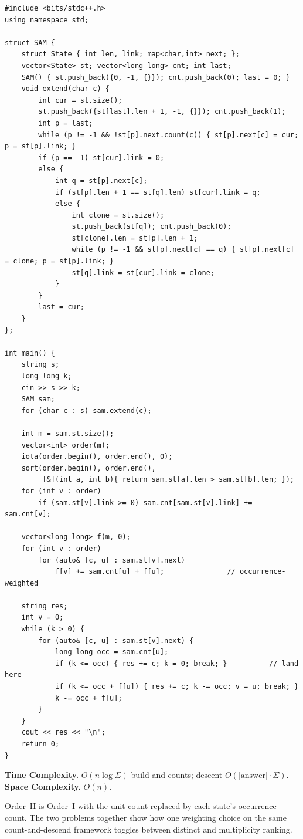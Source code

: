 \begin{lstlisting}
#include <bits/stdc++.h>
using namespace std;

struct SAM {
    struct State { int len, link; map<char,int> next; };
    vector<State> st; vector<long long> cnt; int last;
    SAM() { st.push_back({0, -1, {}}); cnt.push_back(0); last = 0; }
    void extend(char c) {
        int cur = st.size();
        st.push_back({st[last].len + 1, -1, {}}); cnt.push_back(1);
        int p = last;
        while (p != -1 && !st[p].next.count(c)) { st[p].next[c] = cur; p = st[p].link; }
        if (p == -1) st[cur].link = 0;
        else {
            int q = st[p].next[c];
            if (st[p].len + 1 == st[q].len) st[cur].link = q;
            else {
                int clone = st.size();
                st.push_back(st[q]); cnt.push_back(0);
                st[clone].len = st[p].len + 1;
                while (p != -1 && st[p].next[c] == q) { st[p].next[c] = clone; p = st[p].link; }
                st[q].link = st[cur].link = clone;
            }
        }
        last = cur;
    }
};

int main() {
    string s;
    long long k;
    cin >> s >> k;
    SAM sam;
    for (char c : s) sam.extend(c);

    int m = sam.st.size();
    vector<int> order(m);
    iota(order.begin(), order.end(), 0);
    sort(order.begin(), order.end(),
         [&](int a, int b){ return sam.st[a].len > sam.st[b].len; });
    for (int v : order)
        if (sam.st[v].link >= 0) sam.cnt[sam.st[v].link] += sam.cnt[v];

    vector<long long> f(m, 0);
    for (int v : order)
        for (auto& [c, u] : sam.st[v].next)
            f[v] += sam.cnt[u] + f[u];               // occurrence-weighted

    string res;
    int v = 0;
    while (k > 0) {
        for (auto& [c, u] : sam.st[v].next) {
            long long occ = sam.cnt[u];
            if (k <= occ) { res += c; k = 0; break; }          // land here
            if (k <= occ + f[u]) { res += c; k -= occ; v = u; break; }
            k -= occ + f[u];
        }
    }
    cout << res << "\n";
    return 0;
}
\end{lstlisting}

\begin{complexitybox}
\textbf{Time Complexity.} $O(n\log\Sigma)$ build and counts; descent
$O(|\text{answer}|\cdot\Sigma)$. \textbf{Space Complexity.} $O(n)$.
\end{complexitybox}

\begin{takeawaybox}
Order~II is Order~I with the unit count replaced by each state's occurrence
count. The two problems together show how one weighting choice on the same
count-and-descend framework toggles between distinct and multiplicity
ranking.
\end{takeawaybox}

